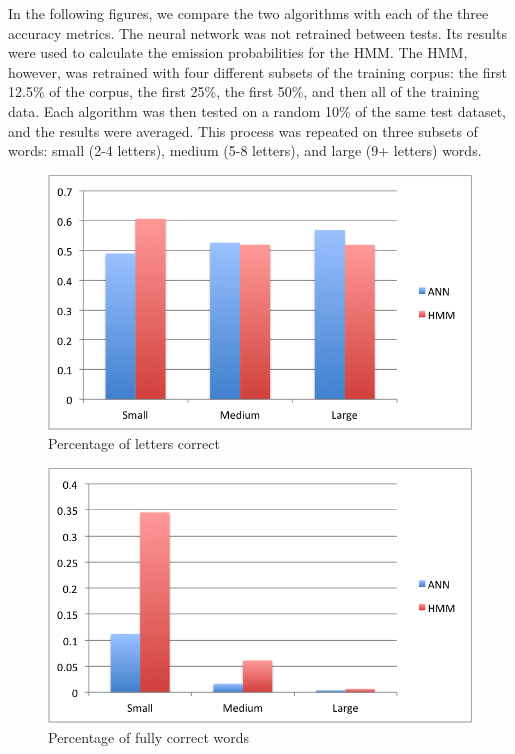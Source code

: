 \documentclass[11pt,a4paper,twocolumn]{article}
\begin{document}
In the following figures, we compare the two algorithms with each of the three accuracy metrics. The neural network was not retrained between tests. Its results were used to calculate the emission probabilities for the HMM. The HMM, however, was retrained with four different subsets of the training corpus: the first 12.5\% of the corpus, the first 25\%, the first 50\%, and then all of the training data. Each algorithm was then tested on a random 10\% of the same test dataset, and the results were averaged. This process was repeated on three subsets of words: small (2-4 letters), medium (5-8 letters), and large (9+ letters) words.

\begin{figure}[h]
\centering
\caption{Percentage of letters correct}
\includegraphics[scale=0.55]{img/lettersCorrect.png}
\end{figure}

\begin{figure}[h]
\centering
\caption{Percentage of fully correct words}
\includegraphics[scale=0.55]{img/wordsCorrect.png}
\end{figure}
\end{document}
